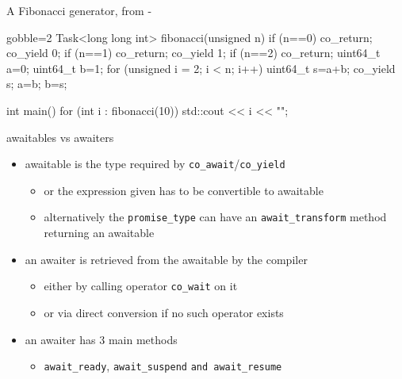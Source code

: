 \begin{frame}[fragile]
  \begin{block}{A Fibonacci generator, from  - }
    \scriptsize
     \begin{cppcode*}{gobble=2}
       Task<long long int> fibonacci(unsigned n) {
         if (n==0) co_return;
         co_yield 0;
         if (n==1) co_return;
         co_yield 1;
         if (n==2) co_return;
         uint64_t a=0;
         uint64_t b=1;
         for (unsigned i = 2; i < n; i++) {
           uint64_t s=a+b;
           co_yield s;
           a=b;
           b=s;
         }
       }

       int main() {
         for (int i : fibonacci(10)) {
           std::cout << i << "\n";
         }
       }
    \end{cppcode*}
  \end{block}
\end{frame}

\begin{frame}
  \begin{block}{awaitables vs awaiters}
    \begin{itemize}
    \item awaitable is the type required by \texttt{co_await}/\texttt{co_yield}
      \begin{itemize}
      \item or the expression given has to be convertible to awaitable
      \item alternatively the \texttt{promise_type} can have an \texttt{await_transform} method returning an awaitable
      \end{itemize}
    \item an awaiter is retrieved from the awaitable by the compiler
      \begin{itemize}
      \item either by calling operator \texttt{co_wait} on it
      \item or via direct conversion if no such operator exists
      \end{itemize}
    \item an awaiter has 3 main methods
      \begin{itemize}
      \item \texttt{await_ready}, \texttt{await_suspend} \texttt{and await_resume}
      \end{itemize}
    \end{itemize}
  \end{block}
\end{frame}

